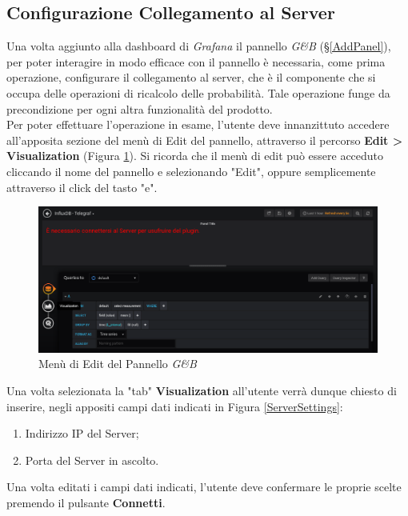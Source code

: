 \subsection{Configurazione Collegamento al Server}\label{CCS}

Una volta aggiunto alla dashboard di \textit{Grafana} il pannello \textit{G\&B} (§\ref{AddPanel}), per poter interagire in modo efficace con il pannello è necessaria, come prima operazione, configurare il collegamento al server, che è il componente che si occupa delle operazioni di ricalcolo delle probabilità. Tale operazione funge da precondizione per ogni altra funzionalità del prodotto.\\
Per poter effettuare l'operazione in esame, l'utente deve innanzittuto accedere all'apposita sezione del menù di Edit del pannello, attraverso il percorso \textbf{Edit > Visualization} (Figura \ref{EditMenu}). Si ricorda che il menù di edit può essere acceduto cliccando il nome del pannello e selezionando "Edit", oppure semplicemente attraverso il click del tasto "e".

\begin{figure}[H]
	\begin{center}
		\includegraphics[scale=0.31]{./images/VisualizServerSettings.png}
		 \caption{Menù di Edit del Pannello \textit{G\&B}}	
		 \label{EditMenu}
	\end{center}
\end{figure}

Una volta selezionata la "tab" \textbf{Visualization} all'utente verrà dunque chiesto di inserire, negli appositi campi dati indicati in Figura \ref{ServerSettings}:
\begin{enumerate}
	\item Indirizzo IP del Server;
	\item Porta del Server in ascolto.
\end{enumerate}
Una volta editati i campi dati indicati, l'utente deve confermare le proprie scelte premendo il pulsante \textbf{Connetti}.\\


